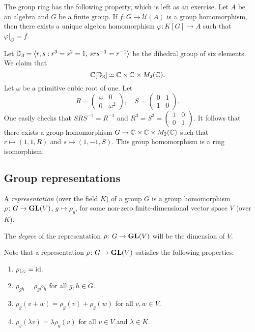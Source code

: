 The group ring has the following property, which is left as an exercise. 
Let $A$ be an algebra and
$G$ be a finite group. If $f\colon G\to\mathcal{U}(A)$ is a group homomorphism, 
then there exists a unique algebra homomorphism $\varphi\colon K[G]\to A$ such that
$\varphi|_G=f$. 

\begin{example}
	Let $\mathbb{D}_3=\langle r,s:r^3=s^2=1,\,srs^{-1}=r^{-1}\rangle$ be the dihedral
	group of six elements. We claim that 
	\[
	\mathbb{C}[\mathbb{D}_3]\simeq\mathbb{C}\times\mathbb{C}\times M_2(\mathbb{C}).
	\]
	Let $\omega$ be a primitive cubic root of one. Let 
	\[
	R=\begin{pmatrix}
		\omega&0\\
		0&\omega^2	
	\end{pmatrix},
	\quad
	S=\begin{pmatrix}
		0&1\\
		1&0
	\end{pmatrix}.
 	\]
 	One easily checks that $SRS^{-1}=R^{-1}$ and $R^3=S^2=\begin{pmatrix}
		1&0\\
		0&1	
	\end{pmatrix}$. It follows that there exists a group homomorphism
	$G\to\mathbb{C}\times\mathbb{C}\times M_2(\mathbb{C})$ such that
	$r\mapsto (1,1,R)$ and $s\mapsto (1,-1,S)$. This group homomorphism
	is a ring isomorphism.  
\end{example}


\subsection{Group representations}

\begin{definition}
	A \emph{representation} (over the field $K$) of a group $G$ is a group homomorphism
	$\rho\colon G\to\mathbf{GL}(V)$, $g\mapsto\rho_g$, for some non-zero finite-dimensional 
        vector space $V$ (over $K$).
\end{definition}

The \emph{degree} of the representation $\rho\colon G\to\mathbf{GL}(V)$ will be the dimension of $V$. 

Note that a representation $\rho\colon G\to\mathbf{GL}(V)$
satisfies the following properties:
\begin{enumerate}
    \item $\rho_{1_G}=\operatorname{id}$.
    \item $\rho_{gh}=\rho_g\rho_h$ for all $g,h\in G$.
    \item $\rho_g(v+w)=\rho_g(v)+\rho_g(w)$ for all $v,w\in V$.
    \item $\rho_g(\lambda v)=\lambda \rho_g(v)$ for all $v\in V$ and $\lambda\in K$. 
\end{enumerate}

